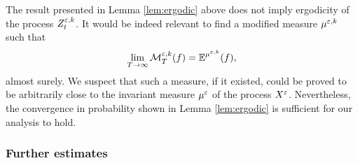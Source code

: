 \documentclass[10pt]{article}
\begin{document}
\begin{remark} The result presented in Lemma \ref{lem:ergodic} above does not imply ergodicity of the process $Z_t^{\varepsilon, k}$. It would be indeed relevant to find a modified measure $\mu^{\varepsilon, k}$ such that
	\begin{equation}
		\lim_{T\to\infty} \mathcal M_T^{\varepsilon, k}(f) = \operatorname{\mathbb{E}}^{\mu^{\varepsilon,k}}(f),
	\end{equation}
	almost surely. We suspect that such a measure, if it existed, could be proved to be arbitrarily close to the invariant measure $\mu^{\varepsilon}$ of the process $X^\varepsilon$. Nevertheless, the convergence in probability shown in Lemma \ref{lem:ergodic} is sufficient for our analysis to hold.
\end{remark}

\subsubsection{Further estimates}
\end{document}
